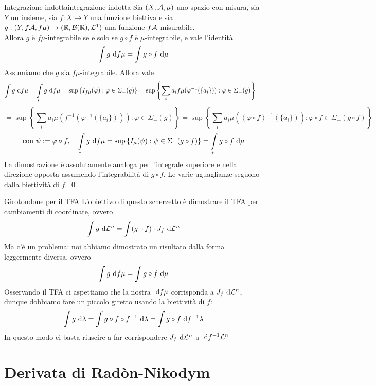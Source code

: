 \documentclass[openany]{book}
\begin{document}
\begin{theorem}{Integrazione indotta}{integrazione indotta}
    Sia $(X,\mathcal{A},\mu)$ uno spazio con misura, sia $Y$ un insieme, sia $f:X\to Y$ una funzione biettiva e sia $g:(Y,f\mathcal{A},f\mu)\to (\mathbb{R},\mathcal{B}(\mathbb{R}),\mathcal{L}^1)$ una funzione $f\mathcal{A}$-misurabile.\\
    Allora $g$ è $f\mu$-integrabile se e solo se $g\circ f$ è $\mu$-integrabile, e vale l'identità
    \[\intop g \de f\mu = \intop g\circ f \de \mu\]
    \proof
    Assumiamo che $g$ sia $f\mu$-integrabile. Allora vale
    \[\intop g \de f\mu = \intop_* g \de f\mu = \sup\left\{I_{f\mu}(\varphi) : \varphi \in \Sigma_-(g)\right\}=\sup\left\{ \sum_i a_i f\mu(\varphi^{-1}(\{a_i\})) : \varphi \in \Sigma_-(g) \right\} =\]
    \[ = \sup\left\{ \sum_i a_i \mu(f^{-1}(\varphi^{-1}(\{a_i\}))) : \varphi \in \Sigma_-(g) \right\} = \sup\left\{ \sum_i a_i \mu((\varphi \circ f)^{-1}(\{a_i\})) : \varphi \circ f \in \Sigma_-(g\circ f) \right\}\]
    \[\text{con } \psi := \varphi \circ f, \quad \intop_* g \de f\mu =\sup\left\{ I_\mu(\psi) : \psi \in \Sigma_-(g\circ f) \right\} = \intop_* g \circ f \de \mu\]
    La dimostrazione è assolutamente analoga per l'integrale superiore e nella direzione opposta assumendo l'integrabilità di $g\circ f$. Le varie uguaglianze seguono dalla biettività di $f$.
    \qed
\end{theorem}

\begin{remark}{Girotondone per il TFA}{}
    L'obiettivo di questo scherzetto è dimostrare il TFA per cambiamenti di coordinate, ovvero
    \[\intop g \de \L^n = \intop (g \circ f)\cdot J_f \de \L^n  \]
    Ma c'è un problema: noi abbiamo dimostrato un risultato dalla forma leggermente diversa, ovvero 
    \[\intop g \de f\mu = \intop g\circ f \de \mu \]
    Osservando il TFA ci aspettiamo che la nostra $\text{ d} f\mu$ corrisponda a $J_f \text{ d} \mathcal{L}^n$, dunque dobbiamo fare un piccolo giretto usando la biettività di $f$:
    \[\intop g \de \lambda = \intop g \circ f \circ f^{-1} \de \lambda = \intop g \circ f \de f^{-1}\lambda\]
    In questo modo ci basta riuscire a far corrispondere $J_f \text{ d} \mathcal{L}^n$ a $\text{ d} f^{-1} \mathcal{L}^n$
\end{remark}

\section{Derivata di Radòn-Nikodym}
\end{document}
